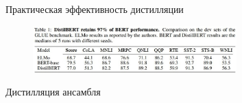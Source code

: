 \documentclass[9pt]{beamer}
\begin{document}
\begin{frame}{Практическая эффективность дистилляции}
    \begin{figure}{}
        \centering
        \includegraphics[width=0.7\textwidth]{images/image7.jpg}
    \end{figure}
\end{frame}

\begin{frame}{Дистилляция ансамбля}
    
\end{frame}







\end{document}
